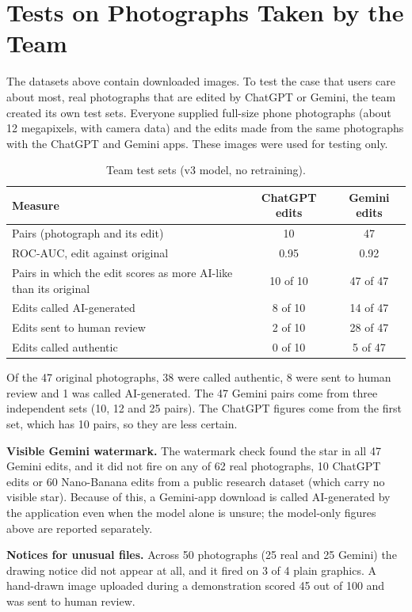 \section{Tests on Photographs Taken by the Team}
The datasets above contain downloaded images. To test the case that users care about most, real photographs that are edited by ChatGPT or Gemini, the team created its own test sets. Everyone supplied full-size phone photographs (about 12 megapixels, with camera data) and the edits made from the same photographs with the ChatGPT and Gemini apps. These images were used for testing only.

\begin{table}[htbp]
\centering\small
\caption{Team test sets (v3 model, no retraining).}
\begin{tabularx}{\linewidth}{@{}X c c@{}}
\toprule
Measure & ChatGPT edits & Gemini edits\\
\midrule
Pairs (photograph and its edit) & 10 & 47\\
ROC-AUC, edit against original & 0.95 & 0.92\\
Pairs in which the edit scores as more AI-like than its original & 10 of 10 & 47 of 47\\
Edits called AI-generated & 8 of 10 & 14 of 47\\
Edits sent to human review & 2 of 10 & 28 of 47\\
Edits called authentic & 0 of 10 & 5 of 47\\
\bottomrule
\end{tabularx}
\end{table}

Of the 47 original photographs, 38 were called authentic, 8 were sent to human review and 1 was called AI-generated. The 47 Gemini pairs come from three independent sets (10, 12 and 25 pairs). The ChatGPT figures come from the first set, which has 10 pairs, so they are less certain.

\textbf{Visible Gemini watermark.} The watermark check found the star in all 47 Gemini edits, and it did not fire on any of 62 real photographs, 10 ChatGPT edits or 60 Nano-Banana edits from a public research dataset (which carry no visible star). Because of this, a Gemini-app download is called AI-generated by the application even when the model alone is unsure; the model-only figures above are reported separately.

\textbf{Notices for unusual files.} Across 50 photographs (25 real and 25 Gemini) the drawing notice did not appear at all, and it fired on 3 of 4 plain graphics. A hand-drawn image uploaded during a demonstration scored 45 out of 100 and was sent to human review.

